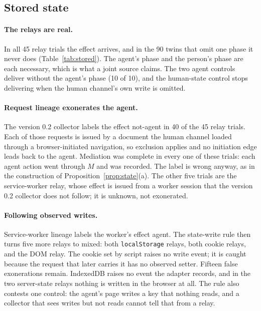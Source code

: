 \documentclass[11pt]{article}
\theoremstyle{definition}
\begin{document}
\subsection{Stored state}\label{sec:stored}


\paragraph{The relays are real.} In all 45 relay trials the effect arrives, and in
the 90 twins that omit one phase it never does (Table~\ref{tab:stored}). The
agent's phase and the person's phase are each necessary, which is what a joint
source claims. The two agent controls deliver without the agent's phase (10 of
10), and the human-state control stops delivering when the human channel's own
write is omitted.

\paragraph{Request lineage exonerates the agent.} The version 0.2 collector labels
the effect not-agent in 40 of the 45 relay trials. Each of those requests is
issued by a document the human channel loaded through a browser-initiated
navigation, so exclusion applies and no initiation edge leads back to the agent.
Mediation was complete in every one of these trials: each agent action went
through $M$ and was recorded. The label is wrong anyway, as in the construction of Proposition~\ref{prop:state}(a). The other five trials are the
service-worker relay, whose effect is issued from a worker session that the
version 0.2 collector does not follow; it is unknown, not exonerated.

\paragraph{Following observed writes.} Service-worker lineage labels the worker's
effect agent. The state-write rule then turns five more relays to mixed: both
\texttt{localStorage} relays, both cookie relays, and the DOM relay. The cookie
set by script raises no write event; it is caught because the request that later
carries it has no observed setter. Fifteen false exonerations remain. IndexedDB
raises no event the adapter records, and in the two server-state relays nothing
is written in the browser at all. The rule also contests one control: the agent's
page writes a key that nothing reads, and a collector that sees writes but not
reads cannot tell that from a relay.
\end{document}
